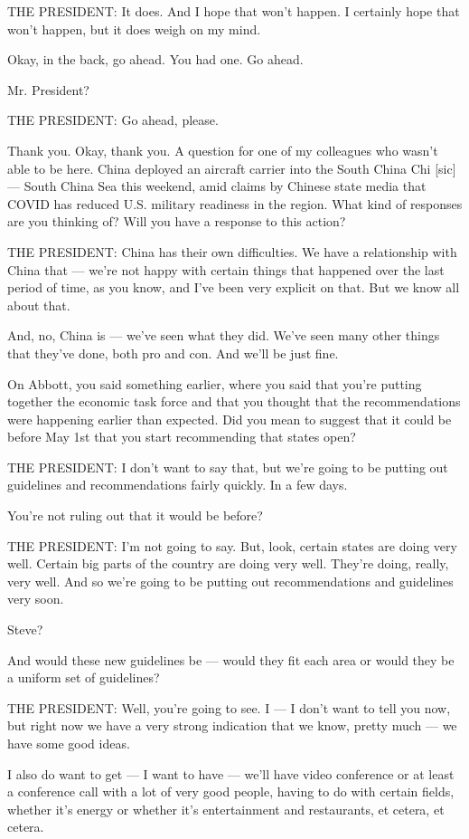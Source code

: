 THE PRESIDENT: It does. And I hope that won't happen. I certainly hope
that won't happen, but it does weigh on my mind.

Okay, in the back, go ahead. You had one. Go ahead.

Mr. President?

THE PRESIDENT: Go ahead, please.

Thank you. Okay, thank you. A question for one of my colleagues who
wasn't able to be here. China deployed an aircraft carrier into the
South China Chi {[}sic{]} --- South China Sea this weekend, amid claims
by Chinese state media that COVID has reduced U.S. military readiness in
the region. What kind of responses are you thinking of? Will you have a
response to this action?

THE PRESIDENT: China has their own difficulties. We have a relationship
with China that --- we're not happy with certain things that happened
over the last period of time, as you know, and I've been very explicit
on that. But we know all about that.

And, no, China is --- we've seen what they did. We've seen many other
things that they've done, both pro and con. And we'll be just fine.

On Abbott, you said something earlier, where you said that you're
putting together the economic task force and that you thought that the
recommendations were happening earlier than expected. Did you mean to
suggest that it could be before May 1st that you start recommending that
states open?

THE PRESIDENT: I don't want to say that, but we're going to be putting
out guidelines and recommendations fairly quickly. In a few days.

You're not ruling out that it would be before?

THE PRESIDENT: I'm not going to say. But, look, certain states are doing
very well. Certain big parts of the country are doing very well. They're
doing, really, very well. And so we're going to be putting out
recommendations and guidelines very soon.

Steve?

And would these new guidelines be --- would they fit each area or would
they be a uniform set of guidelines?

THE PRESIDENT: Well, you're going to see. I --- I don't want to tell you
now, but right now we have a very strong indication that we know, pretty
much --- we have some good ideas.

I also do want to get --- I want to have --- we'll have video conference
or at least a conference call with a lot of very good people, having to
do with certain fields, whether it's energy or whether it's
entertainment and restaurants, et cetera, et cetera.

